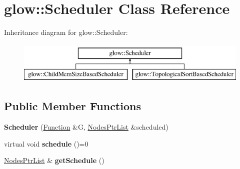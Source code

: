\hypertarget{classglow_1_1_scheduler}{}\section{glow\+:\+:Scheduler Class Reference}
\label{classglow_1_1_scheduler}
Inheritance diagram for glow\+:\+:Scheduler\+:\begin{figure}[H]
\begin{center}
\leavevmode
\includegraphics[height=2.000000cm]{classglow_1_1_scheduler}
\end{center}
\end{figure}
\subsection*{Public Member Functions}
\begin{DoxyCompactItemize}
\item 
\mbox{\label{classglow_1_1_scheduler_a384fa61df71c233ee488387d01f0d240}} 
{\bfseries Scheduler} (\hyperlink{classglow_1_1_function}{Function} \&G, \hyperlink{namespaceglow_a40ec79a2f9c485bfa999ed31fd0854dd}{Nodes\+Ptr\+List} \&scheduled)
\item 
\mbox{\label{classglow_1_1_scheduler_a97e06c83f06cdec915e819c16b7d18ee}} 
virtual void {\bfseries schedule} ()=0
\item 
\mbox{\label{classglow_1_1_scheduler_a11f4dedf2579a66522b47e608b8028dd}} 
\hyperlink{namespaceglow_a40ec79a2f9c485bfa999ed31fd0854dd}{Nodes\+Ptr\+List} \& {\bfseries get\+Schedule} ()
\end{DoxyCompactItemize}
